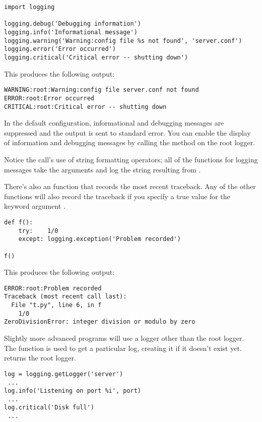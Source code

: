 \documentclass{howto}
\begin{document}
\begin{verbatim}
import logging

logging.debug('Debugging information')
logging.info('Informational message')
logging.warning('Warning:config file %s not found', 'server.conf')
logging.error('Error occurred')
logging.critical('Critical error -- shutting down')
\end{verbatim}

This produces the following output:

\begin{verbatim}
WARNING:root:Warning:config file server.conf not found
ERROR:root:Error occurred
CRITICAL:root:Critical error -- shutting down
\end{verbatim}

In the default configuration, informational and debugging messages are
suppressed and the output is sent to standard error.  You can enable
the display of information and debugging messages by calling the
 method on the root logger.

Notice the  call's use of string formatting
operators; all of the functions for logging messages take the
arguments  and log the
string resulting from .

There's also an  function that records the most
recent traceback.  Any of the other functions will also record the
traceback if you specify a true value for the keyword argument
.

\begin{verbatim}
def f():
    try:    1/0
    except: logging.exception('Problem recorded')

f()
\end{verbatim}

This produces the following output:

\begin{verbatim}
ERROR:root:Problem recorded
Traceback (most recent call last):
  File "t.py", line 6, in f
    1/0
ZeroDivisionError: integer division or modulo by zero
\end{verbatim}

Slightly more advanced programs will use a logger other than the root
logger.  The  function is used to get
a particular log, creating it if it doesn't exist yet.
 returns the root logger.


\begin{verbatim}
log = logging.getLogger('server')
 ...
log.info('Listening on port %i', port)
 ...
log.critical('Disk full')
 ...
\end{verbatim}
\end{document}

